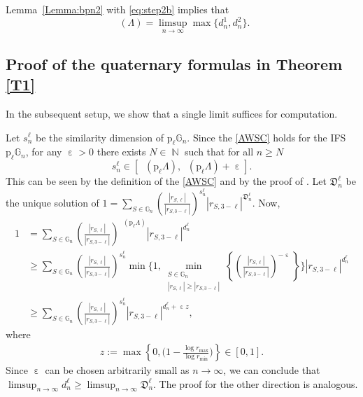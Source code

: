 \documentclass[a4paper, 11pt]{article}
\DeclareMathOperator{\N}{\mathbb{N}}
\DeclareMathOperator{\eps}{\varepsilon}
\DeclareMathOperator{\dB}{\dim_{\mathrm{B}}}
\numberwithin{equation}{section}
\theoremstyle{plain}
\theoremstyle{remark}
\theoremstyle{definition}
\begin{document}
Lemma~\ref{Lemma:bpn2} with \eqref{eq:step2b} implies that
\begin{equation*}
	\dB(\Lambda)=\limsup_{n\to\infty}\max\{d_n^1,d_n^2\}.
\end{equation*}

\subsection{Proof of the quaternary formulas in Theorem \ref{T1}}

In the subsequent setup, we show that a single limit suffices for computation.

Let $s_n^\ell$ be the similarity dimension of $\mathrm{p}_\ell\mathbb{G}_n$. Since the \ref{AWSC} holds for the IFS $\mathrm{p}_\ell\mathbb{G}_n$, for any $\eps > 0$ there exists $N \in \N$ such that for all $n \geq N$
\[
s_n^\ell \in [\dB(\mathrm{p}_\ell\Lambda), \dB(\mathrm{p}_\ell\Lambda) + \eps].
\]
This can be seen by the definition of the \ref{AWSC} and by the proof of \cite[Theorem 4.2.16]{MR4661364}. Let $\mathfrak{D}_n^\ell$ be the unique solution of $1= \sum_{S \in \mathbb{G}_n} \left( \frac{|r_{S,\ell}|}{|r_{S,3-\ell}|} \right)^{s_n^\ell} |r_{S,3-\ell}|^{\mathfrak{D}_n^\ell}$. Now, 
\begin{align*}
1 &= \sum_{S \in \mathbb{G}_n} \left( \frac{|r_{S,\ell}|}{|r_{S,3-\ell}|} \right)^{\dB(\mathrm{p}_\ell\Lambda)} |r_{S,3-\ell}|^{d_n^{\ell}} \\
&\geq \sum_{S \in \mathbb{G}_n} \left( \frac{|r_{S,\ell}|}{|r_{S,3-\ell}|} \right)^{s_n^\ell} \min\Bigg\{ 1, \min_{\substack{S \in \mathbb{G}_n \\ |r_{S,\ell}| \geq |r_{S,3-\ell}|}}\left\{ \left(\frac{|r_{S,\ell}|}{|r_{S,3-\ell}|}\right)^{- \eps} \right\} \Bigg\} |r_{S,3-\ell}|^{d_n^\ell} \\
&\geq \sum_{S \in \mathbb{G}_n} \left( \frac{|r_{S,\ell}|}{|r_{S,3-\ell}|} \right)^{s_n^\ell} |r_{S,3-\ell}|^{d_n^\ell + \eps z},
\end{align*}
where
\begin{align*}
z := \max\left\{0, \Big(1-\frac{\log r_{\max}}{\log r_{\min}}\Big) \right\} \in [0,1].
\end{align*}
Since $\eps$ can be chosen arbitrarily small as $n \to \infty$, we can conclude that $\limsup_{n \to \infty} d_n^\ell \geq \limsup_{n \to \infty} \mathfrak{D}_n^\ell$. The proof for the other direction is analogous.
\end{document}
